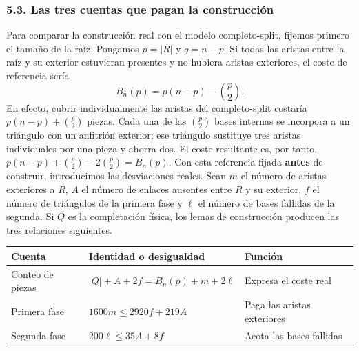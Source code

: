 \documentclass[spanish,11pt,a4paper]{article}
\newcounter{none}
\begin{document}
\subsubsection{5.3. Las tres cuentas que pagan la construcción}\label{las-tres-cuentas-que-pagan-la-construccion}

Para comparar la construcción real con el modelo completo-split, fijemos primero el tamaño de la raíz. Pongamos \(p=|R|\) y \(q=n-p\). Si todas las aristas entre la raíz y su exterior estuvieran presentes y no hubiera aristas exteriores, el coste de referencia sería \[
B_n(p)=p(n-p)-\binom p2.
\] En efecto, cubrir individualmente las aristas del completo-split costaría \(p(n-p)+\binom p2\) piezas. Cada una de las \(\binom p2\) bases internas se incorpora a un triángulo con un anfitrión exterior; ese triángulo sustituye tres aristas individuales por una pieza y ahorra dos. El coste resultante es, por tanto, \(p(n-p)+\binom p2-2\binom p2=B_n(p)\). Con esta referencia fijada \textbf{antes} de construir, introducimos las desviaciones reales. Sean \(m\) el número de aristas exteriores a \(R\), \(A\) el número de enlaces ausentes entre \(R\) y su exterior, \(f\) el número de triángulos de la primera fase y \(\ell\) el número de bases fallidas de la segunda. Si \(Q\) es la completación física, los lemas de construcción producen las tres relaciones siguientes.


{\def\LTcaptype{none} %
\begin{longtable}[c]{@{}
  >{\raggedright\arraybackslash}p{}
  >{\raggedright\arraybackslash}p{}
  >{\raggedright\arraybackslash}p{}@{}}
\toprule\noalign{}
\begin{minipage}[b]{\linewidth}\raggedright
Cuenta
\end{minipage} & \begin{minipage}[b]{\linewidth}\raggedright
Identidad o desigualdad
\end{minipage} & \begin{minipage}[b]{\linewidth}\raggedright
Función
\end{minipage} \\
\midrule\noalign{}
\endhead
\bottomrule\noalign{}
\endlastfoot
Conteo de piezas & \(|Q|+A+2f=B_n(p)+m+2\ell\) & Expresa el coste real \\
Primera fase & \(1600m\le2920f+219A\) & Paga las aristas exteriores \\
Segunda fase & \(200\ell\le35A+8f\) & Acota las bases fallidas \\
\end{longtable}
}
\end{document}
